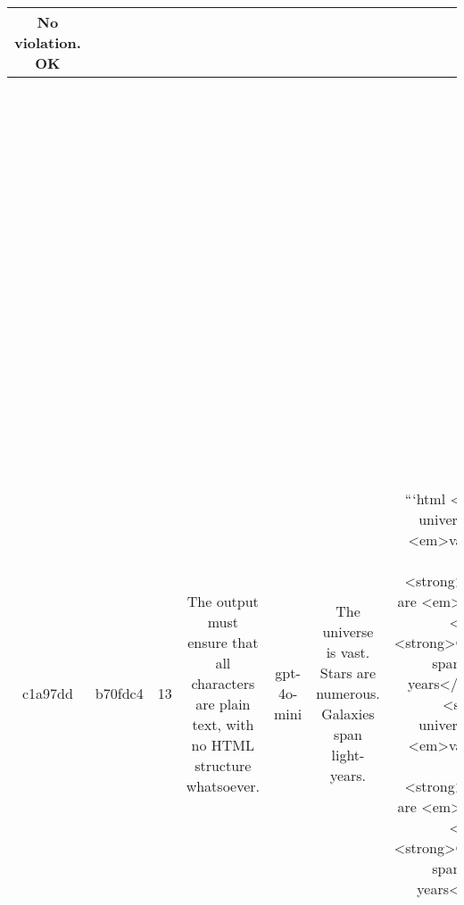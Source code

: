 \begin{table}[h!]
\begin{tabular}{|c|c|c|c|c|c|c|c|c|c|}
No violation.
OK & \\
\hline
c1a97dd & b70fdc4 & 13 & The output must ensure that all characters are plain text, with no HTML structure whatsoever. & gpt-4o-mini & The universe is vast. Stars are numerous. Galaxies span light-years. & ```html
<p><strong>The universe</strong> is <em>vast</em>.</p>
<p><strong>Stars</strong> are <em>numerous</em>.</p>
<p><strong>Galaxies</strong> span <em>light-years</em>.</p>
<p><strong>The universe</strong> is <em>vast</em>.</p>
<p><strong>Stars</strong> are <em>numerous</em>.</p>
<p><strong>Galaxies</strong> span <em>light-years</em>.</p>
``` & err & According to the chatbot's description, the output should include at least three <p> tags, each containing one <strong> tag and multiple <em> tags to emphasize key words and phrases. The given output includes six <p> tags, each with one <strong> tag and one <em> tag. While the number of <p> tags is sufficient, each <p> tag only contains one <em> tag, which is not compliant because "multiple" <em> tags are required.

Hence, there is a clear violation concerning the number of <em> tags within each <p> tag.

ERR & \\
\hline
8a3836b & b70fdc4 & 13 & The output must ensure that all characters are plain text, with no HTML structure whatsoever. & gpt-4o-mini & Ideas ignite change. Actions cement them. Results speak volumes. & ```html
<p><strong>Ideas</strong> <em>ignite</em> <em>change</em>.</p>
<p><strong>Actions</strong> <em>cement</em> them.</p>
<p><strong>Results</strong> <em>speak</em> <em>volumes</em>.</p>
<p><strong>Ideas</strong> <em>ignite</em> <em>change</em>.</p>
<p><strong>Actions</strong> <em>cement</em> them.</p>
<p><strong>Results</strong> <em>speak</em> <em>volumes</em>.</p>
``` & ok & The chatbot output contains six `<p>` tags, which comply with the requirement of having at least three. Each `<p>` tag contains one `<strong>` tag and at least one `<em>` tag, fulfilling the specific requirement of having one `<strong>` tag and multiple `<em>` tags to emphasize key words and phrases inside each `<p>` tag.

The output satisfies all the parts of the description that do not require knowing the input. There is no requirement on the variety of sentences, so the repeated sentences still meet the "at least three `<p>` tags" rule and the use of `<strong>` and `<em>` tags.


\end{tabular}
\end{table}
